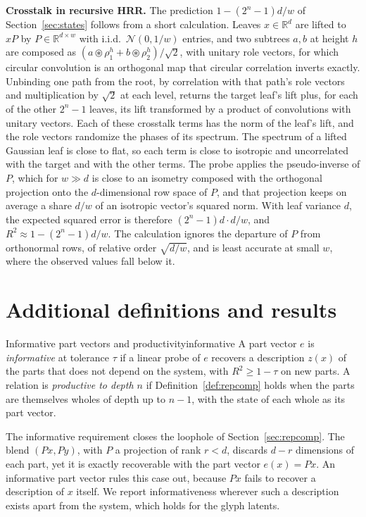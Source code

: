 \documentclass[10pt]{article}
\theoremstyle{plain}
\theoremstyle{remark}
\newcommand{\R}{\mathbb{R}}
\begin{document}
\noindent
\textbf{Crosstalk in recursive HRR.} The prediction $1 - (2^n - 1)d/w$ of Section~\ref{sec:states} follows from a short calculation. Leaves $x \in \R^d$ are lifted to $xP$ by $P \in \R^{d \times w}$ with i.i.d.\ $\mathcal{N}(0, 1/w)$ entries, and two subtrees $a, b$ at height $h$ are composed as $(a \circledast \rho^h_1 + b \circledast \rho^h_2)/\sqrt{2}$, with unitary role vectors, for which circular convolution is an orthogonal map that circular correlation inverts exactly. Unbinding one path from the root, by correlation with that path's role vectors and multiplication by $\sqrt{2}$ at each level, returns the target leaf's lift plus, for each of the other $2^n - 1$ leaves, its lift transformed by a product of convolutions with unitary vectors. Each of these crosstalk terms has the norm of the leaf's lift, and the role vectors randomize the phases of its spectrum. The spectrum of a lifted Gaussian leaf is close to flat, so each term is close to isotropic and uncorrelated with the target and with the other terms. The probe applies the pseudo-inverse of $P$, which for $w \gg d$ is close to an isometry composed with the orthogonal projection onto the $d$-dimensional row space of $P$, and that projection keeps on average a share $d/w$ of an isotropic vector's squared norm. With leaf variance $d$, the expected squared error is therefore $(2^n - 1)d \cdot d/w$, and $R^2 \approx 1 - (2^n - 1)d/w$. The calculation ignores the departure of $P$ from orthonormal rows, of relative order $\sqrt{d/w}$, and is least accurate at small $w$, where the observed values fall below it.

\section{Additional definitions and results}
\label{app:defs}
\label{app:extra}

\begin{defbox}{Informative part vectors and productivity}{informative}
A part vector $e$ is \emph{informative} at tolerance $\tau$ if a linear probe of $e$ recovers a description $z(x)$ of the parts that does not depend on the system, with $R^2 \ge 1 - \tau$ on new parts. A relation is \emph{productive to depth $n$} if Definition~\ref{def:repcomp} holds when the parts are themselves wholes of depth up to $n - 1$, with the state of each whole as its part vector.
\end{defbox}

The informative requirement closes the loophole of Section~\ref{sec:repcomp}. The blend $(Px, Py)$, with $P$ a projection of rank $r < d$, discards $d - r$ dimensions of each part, yet it is exactly recoverable with the part vector $e(x) = Px$. An informative part vector rules this case out, because $Px$ fails to recover a description of $x$ itself. We report informativeness wherever such a description exists apart from the system, which holds for the glyph latents.
\end{document}
